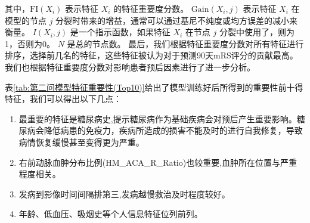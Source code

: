 \documentclass[bwprint]{gmcmthesis}
\begin{document}
其中，$\text{FI}(X_i)$ 表示特征 $X_i$ 的特征重要度分数。
$\text{Gain}(X_i, j)$ 表示特征 $X_i$ 在模型的节点 $j$ 分裂时带来的增益，通常可以通过基尼不纯度或均方误差的减小来衡量。
$I(X_i, j)$ 是一个指示函数，如果特征 $X_i$ 在节点 $j$ 分裂中使用了，则为1，否则为0。
$N$ 是总的节点数。
最后，我们根据特征重要度分数对所有特征进行排序，选择前几名的特征，这些特征被认为对于预测90天mRS评分的贡献最高。
我们也根据特征重要度分数对影响患者预后因素进行了进一步分析。

表\ref{tab:第二问模型特征重要性(Top10)}给出了模型训练好后所得到的重要性前十得特征，我们可以得出以下几点：
\begin{enumerate}
    \item 最重要的特征是糖尿病史,提示糖尿病作为基础疾病会对预后产生重要影响。糖尿病会降低病患的免疫力，疾病所造成的损害不能及时的进行自我修复，导致病情恢复缓慢甚至变得更为严重。
    \item 右前动脉血肿分布比例(HM\_ACA\_R\_Ratio)也较重要,血肿所在位置与严重程度相关。
    \item 发病到影像时间间隔排第三,发病越慢救治及时程度较好。
    \item 年龄、低血压、吸烟史等个人信息特征位列前列。
\end{enumerate}
\end{document}
